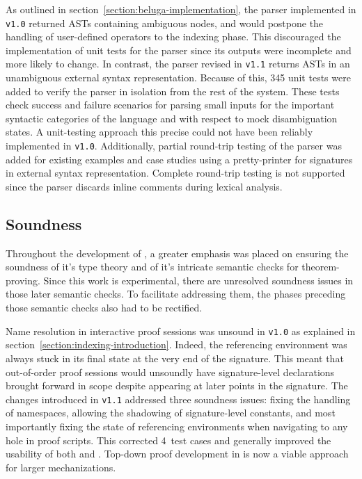 As outlined in section~\ref{section:beluga-implementation}, the parser implemented in \texttt{v1.0} returned \acp{AST} containing ambiguous nodes, and would postpone the handling of user-defined operators to the indexing phase.
This discouraged the implementation of unit tests for the parser since its outputs were incomplete and more likely to change.
In contrast, the parser revised in \texttt{v1.1} returns \acp{AST} in an unambiguous external syntax representation.
Because of this, \num{345} unit tests were added to verify the parser in isolation from the rest of the system.
These tests check success and failure scenarios for parsing small inputs for the important syntactic categories of the language and with respect to mock disambiguation states.
A unit-testing approach this precise could not have been reliably implemented in \texttt{v1.0}.
Additionally, partial round-trip testing of the parser was added for existing \Beluga examples and case studies using a pretty-printer for signatures in external syntax representation.
Complete round-trip testing is not supported since the parser discards inline comments during lexical analysis.

\subsection*{Soundness}


Throughout the development of \Beluga, a greater emphasis was placed on ensuring the soundness of it's type theory and of it's intricate semantic checks for theorem-proving.
Since this work is experimental, there are unresolved soundness issues in those later semantic checks.
To facilitate addressing them, the phases preceding those semantic checks also had to be rectified.


Name resolution in interactive \Harpoon proof sessions was unsound in \texttt{v1.0} as explained in section~\ref{section:indexing-introduction}.
Indeed, the referencing environment was always stuck in its final state at the very end of the \Beluga signature.
This meant that out-of-order proof sessions would unsoundly have signature-level declarations brought forward in scope despite appearing at later points in the signature.
The changes introduced in \texttt{v1.1} addressed three soundness issues: fixing the handling of namespaces, allowing the shadowing of signature-level constants, and most importantly fixing the state of referencing environments when navigating to any hole in \Harpoon proof scripts.
This corrected \num{4}~test cases and generally improved the usability of both \Beluga and \Harpoon.
Top-down proof development in \Harpoon is now a viable approach for larger mechanizations.


